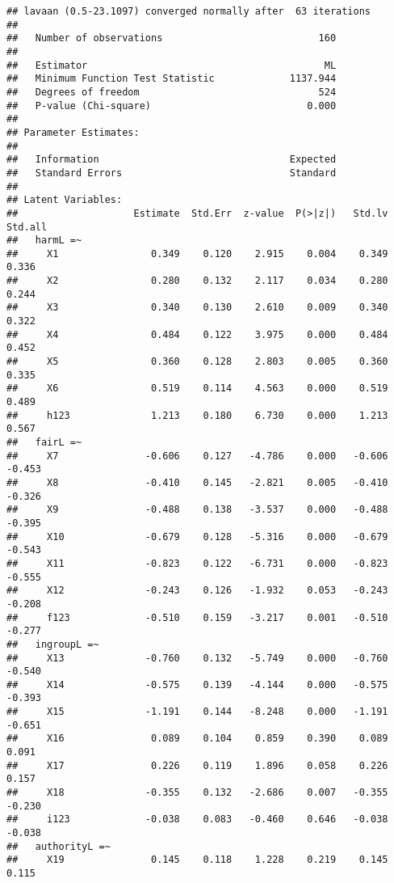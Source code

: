 \documentclass[english,man]{apa6}
\newcounter{author}
\theoremstyle{definition}
\theoremstyle{definition}
\theoremstyle{definition}
\theoremstyle{remark}
\begin{document}
\begin{verbatim}
## lavaan (0.5-23.1097) converged normally after  63 iterations
## 
##   Number of observations                           160
## 
##   Estimator                                         ML
##   Minimum Function Test Statistic             1137.944
##   Degrees of freedom                               524
##   P-value (Chi-square)                           0.000
## 
## Parameter Estimates:
## 
##   Information                                 Expected
##   Standard Errors                             Standard
## 
## Latent Variables:
##                    Estimate  Std.Err  z-value  P(>|z|)   Std.lv  Std.all
##   harmL =~                                                              
##     X1                0.349    0.120    2.915    0.004    0.349    0.336
##     X2                0.280    0.132    2.117    0.034    0.280    0.244
##     X3                0.340    0.130    2.610    0.009    0.340    0.322
##     X4                0.484    0.122    3.975    0.000    0.484    0.452
##     X5                0.360    0.128    2.803    0.005    0.360    0.335
##     X6                0.519    0.114    4.563    0.000    0.519    0.489
##     h123              1.213    0.180    6.730    0.000    1.213    0.567
##   fairL =~                                                              
##     X7               -0.606    0.127   -4.786    0.000   -0.606   -0.453
##     X8               -0.410    0.145   -2.821    0.005   -0.410   -0.326
##     X9               -0.488    0.138   -3.537    0.000   -0.488   -0.395
##     X10              -0.679    0.128   -5.316    0.000   -0.679   -0.543
##     X11              -0.823    0.122   -6.731    0.000   -0.823   -0.555
##     X12              -0.243    0.126   -1.932    0.053   -0.243   -0.208
##     f123             -0.510    0.159   -3.217    0.001   -0.510   -0.277
##   ingroupL =~                                                           
##     X13              -0.760    0.132   -5.749    0.000   -0.760   -0.540
##     X14              -0.575    0.139   -4.144    0.000   -0.575   -0.393
##     X15              -1.191    0.144   -8.248    0.000   -1.191   -0.651
##     X16               0.089    0.104    0.859    0.390    0.089    0.091
##     X17               0.226    0.119    1.896    0.058    0.226    0.157
##     X18              -0.355    0.132   -2.686    0.007   -0.355   -0.230
##     i123             -0.038    0.083   -0.460    0.646   -0.038   -0.038
##   authorityL =~                                                         
##     X19               0.145    0.118    1.228    0.219    0.145    0.115

\end{verbatim}
\end{document}
